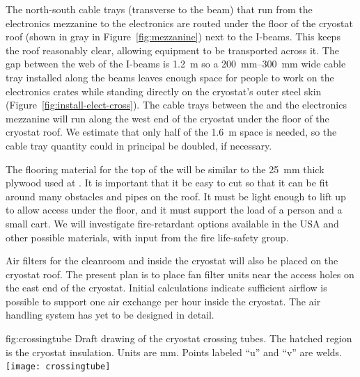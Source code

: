 The north-south cable trays (transverse to the beam) that run from the electronics mezzanine to the electronics \fdth are routed under the floor of the cryostat roof (shown in gray in Figure~\ref{fig:mezzanine}) next to the 
I-beams. 
This keeps the roof reasonably clear, allowing equipment to be transported across it. 
The gap between the web of the I-beams is \SI{1.2}{m} so 
a \SIrange{200}{300}{mm} wide cable tray installed along the beams 
leaves enough space for people to work on the electronics crates while standing directly on the cryostat's outer steel skin (Figure~\ref{fig:install-elect-cross}). 
The cable trays between the  and the electronics mezzanine will run along the west end of the cryostat under the floor of the cryostat roof. 
We estimate that only half of the \SI{1.6}{m} space is needed, so the cable tray quantity could in principal be doubled, if necessary. 

The flooring material for the top of the 
will be similar to the \SI{25}{mm} thick plywood used at . 
It is important that it be easy to cut so that it can be fit around many obstacles and pipes on the roof. 
It must be light enough to lift up to allow access under the floor, and it must support the load of a person and a small cart. 
We will investigate fire-retardant options available in the USA and other possible materials, with input from the  fire life-safety group. 

Air filters for the cleanroom and inside the cryostat will also be placed on the cryostat roof. The present plan is to place fan filter units near the %
access holes on the east end of the cryostat. Initial calculations indicate sufficient airflow is possible to support one air exchange per hour inside the cryostat. The air handling system has yet to be designed in detail.


\begin{dunefigure}{fig:crossingtube}
  {Draft drawing of the cryostat crossing tubes. The hatched region is the cryostat insulation. Units are mm. Points labeled ``u'' and ``v'' are welds. }
\texttt{[image: crossingtube]}
\end{dunefigure}
 
